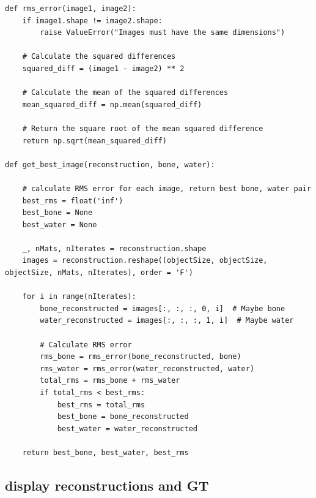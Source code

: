 \begin{verbatim}
def rms_error(image1, image2):
    if image1.shape != image2.shape:
        raise ValueError("Images must have the same dimensions")

    # Calculate the squared differences
    squared_diff = (image1 - image2) ** 2

    # Calculate the mean of the squared differences
    mean_squared_diff = np.mean(squared_diff)

    # Return the square root of the mean squared difference
    return np.sqrt(mean_squared_diff)

def get_best_image(reconstruction, bone, water):

    # calculate RMS error for each image, return best bone, water pair
    best_rms = float('inf')
    best_bone = None
    best_water = None

    _, nMats, nIterates = reconstruction.shape
    images = reconstruction.reshape((objectSize, objectSize, objectSize, nMats, nIterates), order = 'F')    
    
    for i in range(nIterates):
        bone_reconstructed = images[:, :, :, 0, i]  # Maybe bone
        water_reconstructed = images[:, :, :, 1, i]  # Maybe water

        # Calculate RMS error
        rms_bone = rms_error(bone_reconstructed, bone)
        rms_water = rms_error(water_reconstructed, water)
        total_rms = rms_bone + rms_water
        if total_rms < best_rms:
            best_rms = total_rms
            best_bone = bone_reconstructed
            best_water = water_reconstructed
    
    return best_bone, best_water, best_rms
\end{verbatim}

\subsection{display reconstructions and GT}

